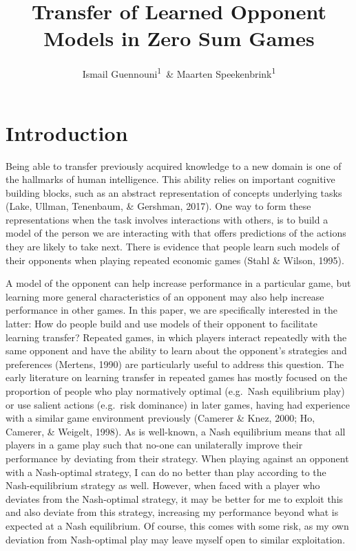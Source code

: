 \documentclass[man,floatsintext]{apa6}
\affiliation{
\vspace{0.5cm}
\textsuperscript{1} Department of Experimental Psychology, University College London}
\title{Transfer of Learned Opponent Models in Zero Sum Games}
\author{Ismail Guennouni\textsuperscript{1}~\& Maarten Speekenbrink\textsuperscript{1}}
\date{}
\begin{document}
\maketitle

\hypertarget{introduction}{%
\section{Introduction}\label{introduction}}

Being able to transfer previously acquired knowledge to a new domain is one of the hallmarks of human intelligence. This ability relies on important cognitive building blocks, such as an abstract representation of concepts underlying tasks (Lake, Ullman, Tenenbaum, \& Gershman, 2017). One way to form these representations when the task involves interactions with others, is to build a model of the person we are interacting with that offers predictions of the actions they are likely to take next. There is evidence that people learn such models of their opponents when playing repeated economic games (Stahl \& Wilson, 1995).

A model of the opponent can help increase performance in a particular game, but learning more general characteristics of an opponent may also help increase performance in other games. In this paper, we are specifically interested in the latter: How do people build and use models of their opponent to facilitate learning transfer? Repeated games, in which players interact repeatedly with the same opponent and have the ability to learn about the opponent's strategies and preferences (Mertens, 1990) are particularly useful to address this question. The early literature on learning transfer in repeated games has mostly focused on the proportion of people who play normatively optimal (e.g.~Nash equilibrium play) or use salient actions (e.g.~risk dominance) in later games, having had experience with a similar game environment previously (Camerer \& Knez, 2000; Ho, Camerer, \& Weigelt, 1998). As is well-known, a Nash equilibrium means that all players in a game play such that no-one can unilaterally improve their performance by deviating from their strategy. When playing against an opponent with a Nash-optimal strategy, I can do no better than play according to the Nash-equilibrium strategy as well. However, when faced with a player who deviates from the Nash-optimal strategy, it may be better for me to exploit this and also deviate from this strategy, increasing my performance beyond what is expected at a Nash equilibrium. Of course, this comes with some risk, as my own deviation from Nash-optimal play may leave myself open to similar exploitation.
\end{document}
